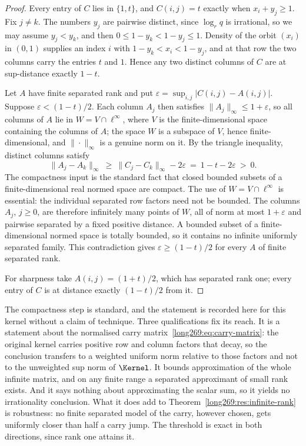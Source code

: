 \begin{proof}
Every entry of $C$ lies in $\{1,t\}$, and $C(i,j)=t$ exactly when
$x_i+y_j\ge1$.  Fix $j\ne k$.  The numbers $y_j$ are pairwise distinct, since
$\log_r q$ is irrational, so we may assume $y_j<y_k$, and then
$0\le1-y_k<1-y_j\le1$.  Density of the orbit $(x_i)$ in $(0,1)$ supplies an
index $i$ with $1-y_k<x_i<1-y_j$, and at that row the two columns carry the
entries $t$ and $1$.  Hence any two distinct columns of $C$ are at sup-distance
exactly $1-t$.

Let $A$ have finite separated rank and put
$\varepsilon=\sup_{i,j}|C(i,j)-A(i,j)|$.  Suppose $\varepsilon<(1-t)/2$.  Each
column $A_j$ then satisfies $\|A_j\|_\infty\le1+\varepsilon$, so all columns of
$A$ lie in $W=V\cap\ell^{\infty}$, where $V$ is the finite-dimensional space
containing the columns of $A$; the space $W$ is a subspace of $V$, hence
finite-dimensional, and $\|\cdot\|_\infty$ is a genuine norm on it.  By the
triangle inequality, distinct columns satisfy
\[
 \|A_j-A_k\|_\infty\ \ge\ \|C_j-C_k\|_\infty-2\varepsilon
 \ =\ 1-t-2\varepsilon\ >\ 0 .
\]
The compactness input is the standard fact that closed bounded subsets of
a finite-dimensional real normed space are compact. The use of
$W=V\cap\ell^\infty$ is essential: the individual separated row factors
need not be bounded.
The columns $A_j$, $j\ge0$, are therefore infinitely many points of $W$, all of
norm at most $1+\varepsilon$ and pairwise separated by a fixed positive
distance.  A bounded subset of a finite-dimensional normed space is totally
bounded, so it contains no infinite uniformly separated family.  This
contradiction gives $\varepsilon\ge(1-t)/2$ for every $A$ of finite separated
rank.

For sharpness take $A(i,j)=(1+t)/2$, which has separated rank one; every entry
of $C$ is at distance exactly $(1-t)/2$ from it.
\end{proof}

The compactness step is standard, and the statement is recorded here for this
kernel without a claim of technique.  Three qualifications fix its
reach.  It is a statement about the normalised carry
matrix~\eqref{long269:eq:carry-matrix}: the original kernel carries positive row and
column factors that decay, so the conclusion transfers to a weighted uniform
norm relative to those factors and not to the unweighted sup norm of
$\Kernel$.  It bounds approximation of the whole infinite matrix, and on any
finite range a separated approximant of small rank exists.  And it says nothing
about approximating the scalar sum, so it yields no irrationality conclusion.
What it does add to Theorem~\ref{long269:res:infinite-rank} is robustness: no finite
separated model of the carry, however chosen, gets uniformly closer than half a
carry jump.  The threshold is exact in both directions, since rank one attains
it.

